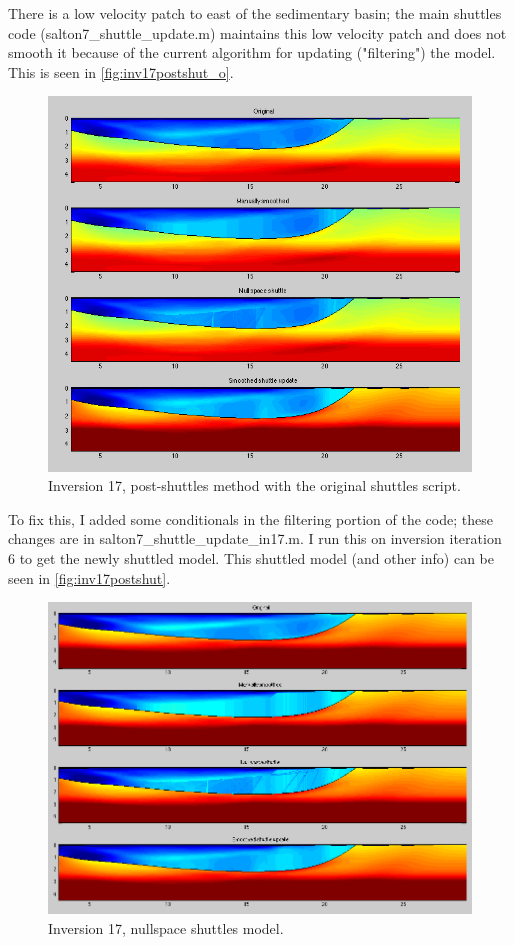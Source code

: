 \documentclass[fontsize=11pt, %
                             paper=a4, %
                             twoside, %
                             captions=tableheading,
                             index=totoc,
                             hyperref]{labbook}
\begin{document}
\begin{addmargin}[4cm]{0cm}
There is a low velocity patch to east of the sedimentary basin; the main shuttles code (salton7\_shuttle\_update.m) maintains this low velocity patch and does not smooth it because of the current algorithm for updating ("filtering") the model.  This is seen in \autoref{fig:inv17postshut_o}.  

\begin{figure}[h!]
\raggedleft
\includegraphics[scale=0.6,keepaspectratio=true]{figs/inv17postshut_orig.png}
\caption{Inversion 17, post-shuttles method with the original shuttles script.}
\label{fig:inv17postshut_o}
\end{figure}

To fix this, I added some conditionals in the filtering portion of the code; these changes are in salton7\_shuttle\_update\_in17.m.  I run this on inversion iteration 6 to get the newly shuttled model.  This shuttled model (and other info) can be seen in \autoref{fig:inv17postshut}.

\begin{figure}[h!]
\raggedleft
\includegraphics[scale=0.4,keepaspectratio=true]{figs/inv17postshut.png}
\caption{Inversion 17, nullspace shuttles model.}
\label{fig:inv17postshut}
\end{figure}


\end{addmargin}
\end{document}
